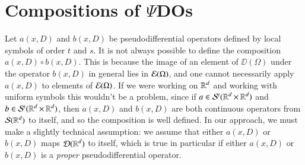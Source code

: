 \begin{comment}
\begin{remark}
    Here, we have worked with symbols satisfying uniform estimates in $x$. But often one can only work with symbols which \emph{locally} satisfy these estimates in $x$, i.e. working in the symbol classes $\loc{\mathcal{S}^t}(\RR^d \times \RR^d)$. The kernels of operators formed from these symbols satisfy bounds of the form
    \[ | \nabla^{n_1}_x \nabla^{n_2}_z K(x,y)| \lesssim_{n_1,n_2,N} \frac{1}{|x-y|^{t + d + n_2 + N}}, \]
    where the implicit constant is \emph{locally uniform} in $x$, and uniform in $y$. On a related note, such operators can be applied to any compactly supported distribution, and satisfy the microlocalization statement $\text{WF}(Tu) \subset \text{WF}(u)$. On the other hand, unless one has a bound such as
    \[ |\nabla_x^{n_1} \nabla_y^{n_2} \nabla_\xi^m a(x,\xi)| \lesssim_{n,m} (\langle x \rangle^{k_{1n}} + \langle y \rangle^{k_{2n}}) \cdot \langle \xi \rangle^{k_{nm}}, \]
    for all $n$ and $m$, it is not necessarily possible to apply the operator to Schwartz functions, and tempered distributions. One can consider asymptotics, as long as we work modulo a weaker family of smoothing operators, i.e. those whose kernels lie in $\EC(\RR^d \times \RR^d)$.
\end{remark}
\end{comment}

\section{Compositions of $\Psi$DOs}

Let $a(x,D)$ and $b(x,D)$ be pseudodifferential operators defined by local symbols of order $t$ and $s$. It is not always possible to define the composition $a(x,D) \circ b(x,D)$. This is because the image of an element of $\DD(\Omega)$ under the operator $b(x,D)$ in general lies in $\operatorname{\mathcal{E}}(\Omega)$, and one cannot necessarily apply $a(x,D)$ to elements of $\operatorname{\mathcal{E}}(\Omega)$. If we were working on $\operatorname{\mathbb{R}}^d$ and working with uniform symbols this wouldn't be a problem, since if $a \in \mathcal{S}^t(\operatorname{\mathbb{R}}^d \times \operatorname{\mathbb{R}}^d)$ and $b \in \mathcal{S}^t(\operatorname{\mathbb{R}}^d \times \operatorname{\mathbb{R}}^d)$, then $a(x,D)$ and $b(x,D)$ are both continuous operators from $\operatorname{\mathcal{S}}(\operatorname{\mathbb{R}}^d)$ to itself, and so the composition is well defined. In our approach, we must make a slightly technical assumption: we assume that either $a(x,D)$ or $b(x,D)$ maps $\operatorname{\mathcal{D}}(\operatorname{\mathbb{R}}^d)$ to itself, which is true in particular if either $a(x,D)$ or $b(x,D)$ is a \emph{proper} pseudodifferential operator.

